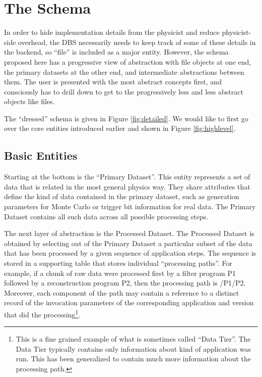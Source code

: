 \documentclass{cmspaper}
\begin{document}
\section{The Schema}

In order to hide implementation details from the physicist and 
reduce physicist-side overhead, the DBS necessarily needs to keep track of some 
of these details in the backend, so ``file'' is included as a major entity. 
However, the schema proposed here has a progressive view of abstraction 
with file objects at one end, the primary datasets at the other end, and 
intermediate abstractions between them.  The user is presented with the most
abstract concepts first, and consciously has to drill 
down to get to the progressively less and less abstract objects like files.

The ``dressed'' schema is given in Figure \ref{fig:detailed}. We 
would like to first go over the core entities introduced earlier and
shown in Figure \ref{fig:highlevel}.

\subsection{Basic Entities}

Starting at the bottom is the ``Primary Dataset''.  This entity represents a 
set of data that is related in the most general physics way.  
They share attributes that define the kind of data contained in the 
primary dataset, such as generation parameters for Monte Carlo or 
trigger bit information for real data.  The Primary Dataset contains all such
data across all possible processing steps.  

The next layer of abstraction
is the Processed Dataset.  The Processed Dataset is obtained by 
selecting out of the Primary Dataset a particular subset of the data that has been 
processed by a given sequence of application steps.  The sequence is stored 
in a supporting table that stores individual ``processing paths''.  For example,
if a chunk of raw data were processed first by a filter program P1 followed 
by a reconstruction program P2, then the processing path is /P1/P2.  Moreover, 
each component of the path may contain a reference to a distinct record of the 
invocation parameters of the corresponding application and version that did 
the processing\footnote{This is a fine grained example of what is sometimes called
``Data Tier''.  The Data Tier typically contains only information about kind
of application was run.  This has been generalized to contain much more information 
about the processing path.}. 
\end{document}
